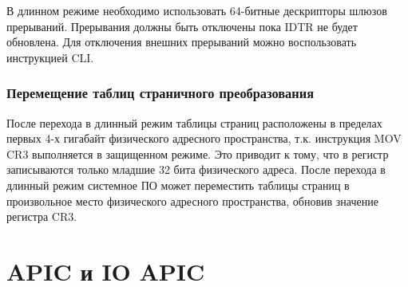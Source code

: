 В длинном режиме необходимо использовать 64-битные дескрипторы шлюзов прерываний. Прерывания должны быть
отключены пока IDTR не будет обновлена. Для отключения внешних прерываний можно воспользовать инструкцией CLI.

\subsubsection*{Перемещение таблиц страничного преобразования}
После перехода в длинный режим таблицы страниц расположены в пределах первых 4-х гигабайт физического
адресного пространства, т.к. инструкция MOV CR3 выполняется в защищенном режиме. Это приводит к тому,
что в регистр записываются только младшие 32 бита физического адреса. После перехода в длинный режим
системное ПО может переместить таблицы страниц в произвольное место физического адресного пространства,
обновив значение регистра CR3.

\section{APIC и IO APIC}
